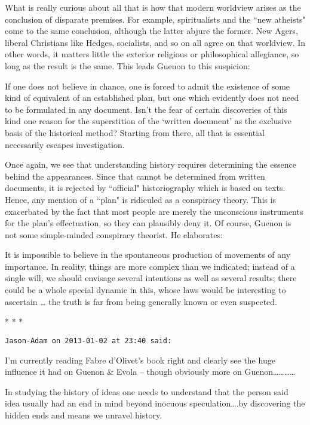 What is really curious about all that is how that modern worldview arises as the conclusion of disparate premises. For example, spiritualists and the ``new atheists" come to the same conclusion, although the latter abjure the former. New Agers, liberal Christians like Hedges, socialists, and so on all agree on that worldview. In other words, it matters little the exterior religious or philosophical allegiance, so long as the result is the same. This leads Guenon to this suspicion:

\begin{quotex}
If one does not believe in chance, one is forced to admit the existence of some kind of equivalent of an established plan, but one which evidently does not need to be formulated in any document. Isn't the fear of certain discoveries of this kind one reason for the superstition of the `written document' as the exclusive basis of the historical method? Starting from there, all that is essential necessarily escapes investigation. 

\end{quotex}
Once again, we see that understanding history requires determining the essence behind the appearances. Since that cannot be determined from written documents, it is rejected by ``official" historiography which is based on texts. Hence, any mention of a ``plan" is ridiculed as a conspiracy theory. This is exacerbated by the fact that most people are merely the unconscious instruments for the plan's effectuation, so they can plausibly deny it. Of course, Guenon is not some simple-minded conspiracy theorist. He elaborates:

\begin{quotex}
It is impossible to believe in the spontaneous production of movements of any importance. In reality, things are more complex than we indicated; instead of a single will, we should envisage several intentions as well as several results; there could be a whole special dynamic in this, whose laws would be interesting to ascertain … the truth is far from being generally known or even suspected. 

\end{quotex}



\begin{center}* * *\end{center}

\begin{footnotesize}\begin{sffamily}



\texttt{Jason-Adam on 2013-01-02 at 23:40 said: }

I'm currently reading Fabre d'Olivet's book right and clearly see the huge influence it had on Guenon \& Evola – though obviously more on Guenon…………

In studying the history of ideas one needs to understand that the person said idea usually had an end in mind beyond inocuous speculation….by discovering the hidden ends and means we unravel history.


\end{sffamily}\end{footnotesize}
